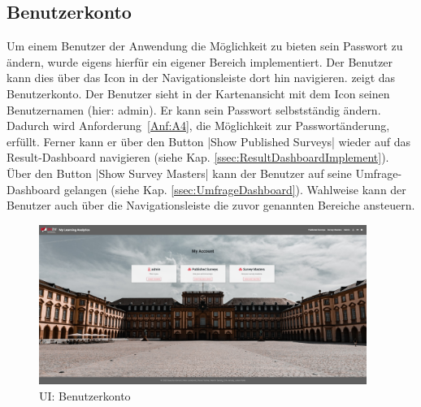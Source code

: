 
\subsection{Benutzerkonto}
\label{ssec:Benutzerkonto}

Um einem Benutzer der Anwendung die Möglichkeit zu bieten sein Passwort zu ändern, wurde eigens hierfür ein eigener Bereich implementiert.
Der Benutzer kann dies über das Icon \faUser[regular]\xspace in der Navigationsleiste dort hin navigieren.
\abb {} zeigt das Benutzerkonto. \newline
Der Benutzer sieht in der Kartenansicht mit dem Icon \faUser[regular]\xspace seinen Benutzernamen (hier: admin).
Er kann sein Passwort selbstständig ändern.
Dadurch wird Anforderung~\ref{Anf:A4}, die Möglichkeit zur Passwortänderung, erfüllt.\newline
Ferner kann er über den Button \jinline|Show Published Surveys| wieder auf das Result-Dashboard navigieren (siehe Kap. \vref{ssec:ResultDashboardImplement}).
Über den Button \jinline|Show Survey Masters| kann der Benutzer auf seine Umfrage-Dashboard gelangen (siehe Kap. \vref{ssec:UmfrageDashboard}).
Wahlweise kann der Benutzer auch über die Navigationsleiste die zuvor genannten Bereiche ansteuern.

\begin{figure}[hp]
	\centering
	\includegraphics[width=0.95\textwidth, keepaspectratio]{img/client/Account.png}
	\captionsetup{justification=centering, format=plain}
	\caption[\acf{UI}: Benutzerkonto]{\acf{UI}: Benutzerkonto \\ \quelleScreenshot}
	\label{fig:AccountImplement}
\end{figure}


